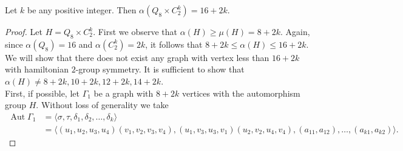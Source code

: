 \documentclass[10pt,a4paper]{amsart}
\newcommand{\Aut}{\mathop{\mathrm{Aut}}}
\begin{document}
	\begin{theorem}
		\label{ham_th1}
		Let $k$ be any positive integer. Then  $\alpha(Q_{8} \times C_{2}^{k}) = 16 + 2k$.
	\end{theorem}

	\begin{proof}
		Let $H=Q_8\times C_2^k$. First we observe that $\alpha(H)\geq\mu(H)=8+2k$. Again, since $\alpha(Q_8)=16$ and $\alpha(C_2^k)=2k$, it follows that $8 + 2k \leq \alpha(H) \leq 16 + 2k$. We will show that there does not exist any graph with vertex less than $16+2k$ with hamiltonian $2$-group symmetry. It is sufficient to show that $\alpha(H)\neq 8+2k, 10+2k, 12+2k, 14+2k$.\\
		First, if possible, let $\Gamma_{1}$ be a graph with $8+2k$ vertices with the automorphism group $H$. Without loss of generality we take
		\begin{align*}
			\Aut \Gamma_{1} &= \langle \sigma, \tau, \delta_{1}, \delta_{2}, \ldots, \delta_{k} \rangle \\
			&= \langle (u_{1}, u_{2}, u_{3}, u_{4})(v_{1}, v_{2}, v_{3}, v_{4}), (u_{1}, v_{3}, u_{3}, v_{1})(u_{2}, v_{2}, u_{4}, v_{4}), (a_{11}, a_{12}), \ldots, (a_{k1}, a_{k2})\rangle .
		\end{align*}
		

\end{proof}
\end{document}
